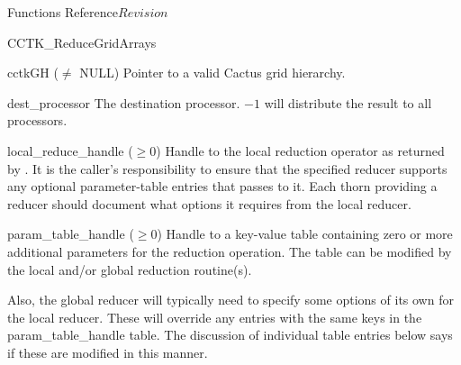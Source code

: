 \begin{cactuspart}{ Functions Reference}{}{$Revision$}
\begin{FunctionDescription}{CCTK\_ReduceGridArrays}
\begin{ParameterSection}
\begin{Parameter}{cctkGH ($\ne$ NULL)}
Pointer to a valid Cactus grid hierarchy.
\end{Parameter}
\begin{Parameter}{dest\_processor}
The destination processor. $-1$ will distribute the result to all processors.
\end{Parameter}
\begin{Parameter}{local\_reduce\_handle ($\ge 0$)}
Handle to the local reduction operator as returned by \newline
{}. It is the caller's responsibility
to ensure that the specified reducer supports any optional
parameter-table entries that \newline {} passes to it.
Each thorn providing a \newline {} reducer should
document what options it requires from the local reducer.
\end{Parameter}
\begin{Parameter}{param\_table\_handle ($\ge 0$)}
Handle to a key-value table containing zero or more additional parameters
for the reduction operation. The table can be modified by the local
and/or global reduction routine(s).

Also, the global reducer will typically need to specify some options
of its own for the local reducer.  These will override any entries
with the same keys in the  param\_table\_handle  table.  The discussion
of individual table entries below says if these are modified in this
manner.


\end{Parameter}
\end{ParameterSection}
\end{FunctionDescription}
\end{cactuspart}
